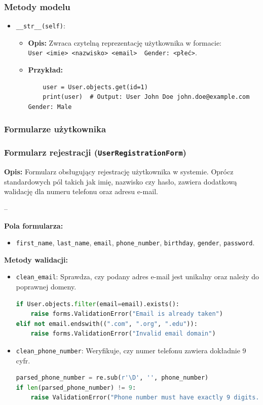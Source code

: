 \documentclass[12pt,a4paper,oneside]{article}
\theoremstyle{definition}
\numberwithin{equation}{section}
\begin{document}
\subsubsection{Metody modelu}
\begin{itemize}
    \item \texttt{\_\_str\_\_(self)}:
    \begin{itemize}
        \item \textbf{Opis:} Zwraca czytelną reprezentację użytkownika w formacie: \\
        \texttt{User <imie> <nazwisko> <email> \ Gender: <płeć>}.
        \item \textbf{Przykład:}
        \begin{lstlisting}
    user = User.objects.get(id=1)
    print(user)  # Output: User John Doe john.doe@example.com Gender: Male
        \end{lstlisting}
    \end{itemize}
\end{itemize}

\subsubsection{Formularze użytkownika}
\linespread{1.3}
\subsubsection*{Formularz rejestracji (\texttt{UserRegistrationForm})} 

\textbf{Opis:}  
Formularz obsługujący rejestrację użytkownika w systemie. Oprócz standardowych pól takich jak imię, nazwisko czy hasło, zawiera dodatkową walidację dla numeru telefonu oraz adresu e-mail.

--

\textbf{Pola formularza:}
\begin{itemize}
    \item \texttt{first\_name}, \texttt{last\_name}, \texttt{email}, \texttt{phone\_number}, \texttt{birthday}, \texttt{gender}, \texttt{password}.
\end{itemize}

\textbf{Metody walidacji:}
\begin{itemize}
    \item \texttt{clean\_email}: Sprawdza, czy podany adres e-mail jest unikalny oraz należy do poprawnej domeny.
\begin{lstlisting}[language=Python]
if User.objects.filter(email=email).exists():
    raise forms.ValidationError("Email is already taken")
elif not email.endswith((".com", ".org", ".edu")):
    raise forms.ValidationError("Invalid email domain")
\end{lstlisting}
    \item \texttt{clean\_phone\_number}: Weryfikuje, czy numer telefonu zawiera dokładnie 9 cyfr.
\begin{lstlisting}[language=Python]
parsed_phone_number = re.sub(r'\D', '', phone_number)
if len(parsed_phone_number) != 9:
    raise ValidationError("Phone number must have exactly 9 digits.")
\end{lstlisting}
\end{itemize}
\end{document}
